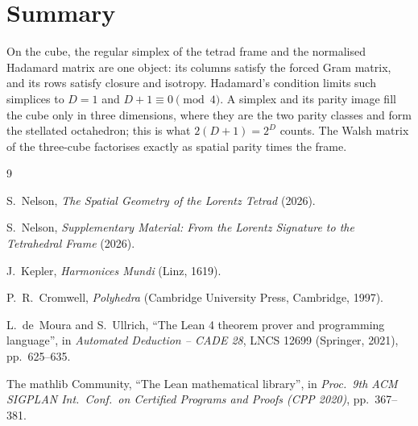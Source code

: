 \documentclass[twocolumn]{iopjournal}
\begin{document}

\section*{Summary}

On the cube, the regular simplex of the tetrad frame and the
normalised Hadamard matrix are one object: its columns satisfy the
forced Gram matrix, and its rows satisfy closure and isotropy.
Hadamard's condition limits such simplices to $D = 1$ and
$D + 1 \equiv 0 \pmod 4$. A simplex and its parity image fill the
cube only in three dimensions, where they are the two parity
classes and form the stellated octahedron; this is what
$2(D+1) = 2^D$ counts. The Walsh matrix of the three-cube factorises
exactly as spatial parity times the frame.


{\small
\begin{thebibliography}{9}

S.~Nelson,
\textit{The Spatial Geometry of the Lorentz Tetrad} (2026).

S.~Nelson,
\textit{Supplementary Material: From the Lorentz Signature to the
Tetrahedral Frame} (2026).

J.~Kepler,
\textit{Harmonices Mundi}
(Linz, 1619).

P.~R.~Cromwell,
\textit{Polyhedra}
(Cambridge University Press, Cambridge, 1997).

L.~de~Moura and S.~Ullrich,
``The Lean 4 theorem prover and programming language'',
in \textit{Automated Deduction -- CADE 28},
LNCS 12699 (Springer, 2021), pp.~625--635.

The mathlib Community,
``The Lean mathematical library'',
in \textit{Proc.\ 9th ACM SIGPLAN Int.\ Conf.\ on Certified Programs
and Proofs (CPP 2020)}, pp.~367--381.

\end{thebibliography}
}
\end{document}
